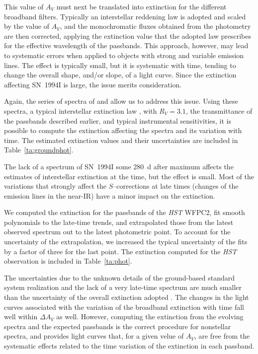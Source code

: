 \documentclass[12pt,manuscript]{aastex}
\begin{document}
This value of $A_V$ must next be translated into extinction for 
the different broadband filters.
%
Typically an interstellar reddening law is adopted and scaled by
the value of $A_V$, and the monochromatic fluxes obtained from 
the photometry are then corrected, applying the extinction value 
that the adopted law prescribes for the effective wavelength
of the passbands.
%
This approach, however, may lead to systematic errors when 
applied to objects with strong and variable emission lines.
%
The effect is typically small, but it is systematic with time,
tending to change the overall shape, and/or slope, of a light curve.
%
Since the extinction affecting SN~1994I is large, the issue 
merits consideration.

Again, the series of spectra of \citet{fetal95} and 
\citet{cetal96b} allow us to address this issue. 
%
Using these spectra,
a typical interstellar extinction law \citep{ccm89}, with $R_V = 3.1$,
the transmittance of the passbands described earlier, and typical
instrumental sensitivities, it is possible to 
compute the extinction affecting the spectra and its 
variation with time.
%
The estimated extinction values and their
uncertainties are included in Table~\ref{ta:groundphot}.


The lack of a spectrum of SN~1994I some 280~d after maximum
affects the estimates of interstellar extinction at the time, but
the effect is small.
%
Most of the variations that strongly affect the $S$--corrections 
at late times (changes of the emission lines in the near-IR) have 
a minor impact on the extinction.


We computed the extinction for the passbands of the {\em HST} 
WFPC2, fit smooth polynomials to the late-time trends, and 
extrapolated those from the latest observed spectrum out to 
the latest photometric point.
%
To account for the uncertainty of the extrapolation, we increased 
the typical uncertainty of the fits by a factor of three for the 
last point.
%
The extinction computed for the {\em HST} observation
is included in Table~\ref{ta:phot}.

The uncertainties due to the unknown details of the 
ground-based standard system realization
and the lack of a very late-time spectrum
are much smaller than the uncertainty of the overall 
extinction adopted \citep[$\Delta A_V \approx 0.5$ mag according to][]{retal96}.
%
The changes in the light curves associated with the 
variation of the broadband extinction with time fall well 
within $\Delta A_V$ as well.
%
However, computing the extinction from the evolving spectra 
and the expected passbands is the correct procedure for 
nonstellar spectra, and provides light curves that, for a 
given velue of $A_V$, are free from the systematic effects
related to the time variation of the extinction in each passband.
\end{document}
